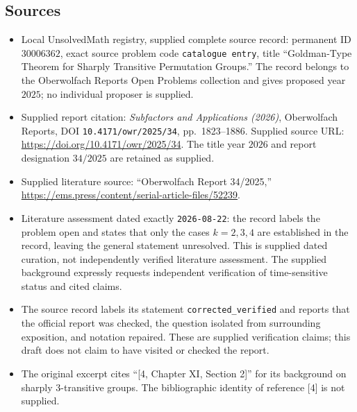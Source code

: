 \documentclass[11pt]{article}
\begin{document}
\subsection{Sources}
\begin{itemize}
\item Local UnsolvedMath registry, supplied complete source record: permanent ID \(30006362\), exact source problem code \texttt{catalogue entry}, title ``Goldman-Type Theorem for Sharply Transitive Permutation Groups.'' The record belongs to the Oberwolfach Reports Open Problems collection and gives proposed year \(2025\); no individual proposer is supplied.
\item Supplied report citation: \emph{Subfactors and Applications (2026)}, Oberwolfach Reports, DOI \texttt{10.4171/owr/2025/34}, pp.\ 1823--1886. Supplied source URL: \url{https://doi.org/10.4171/owr/2025/34}. The title year \(2026\) and report designation \(34/2025\) are retained as supplied.
\item Supplied literature source: ``Oberwolfach Report 34/2025,'' \url{https://ems.press/content/serial-article-files/52239}.
\item Literature assessment dated exactly \texttt{2026-08-22}: the record labels the problem open and states that only the cases \(k=2,3,4\) are established in the record, leaving the general statement unresolved. This is supplied dated curation, not independently verified literature assessment. The supplied background expressly requests independent verification of time-sensitive status and cited claims.
\item The source record labels its statement \texttt{corrected\_verified} and reports that the official report was checked, the question isolated from surrounding exposition, and notation repaired. These are supplied verification claims; this draft does not claim to have visited or checked the report.
\item The original excerpt cites ``[4, Chapter XI, Section 2]'' for its background on sharply \(3\)-transitive groups. The bibliographic identity of reference [4] is not supplied.
\end{itemize}
\end{document}
